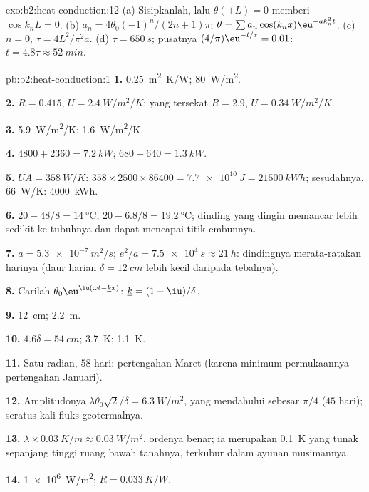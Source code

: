 \begin{solution}{exo:b2:heat-conduction:12}
(a) Sisipkanlah, lalu $\theta(\pm L) = 0$ memberi $\cos k_nL = 0$. (b) $a_n =
4\theta_0(-1)^n/(2n+1)\pi$; $\theta = \sum a_n\cos(k_nx)\eu^{-ak_n^2t}$. (c) $n = 0$,
$\tau = 4L^2/\pi^2a$. (d) $\tau = \qty{650}{s}$; pusatnya $(4/\pi)\eu^{-t/\tau} = 0.01$:
$t = 4.8\tau \approx \qty{52}{min}$.
\end{solution}

\begin{solution}{pb:b2:heat-conduction:1}
\textbf{1.} \qty{0.25}{m^2.K/W}; \qty{80}{W/m^2}.

\textbf{2.} $R = 0.415$, $U = \qty{2.4}{W/m^2/K}$; yang tersekat $R = 2.9$, $U =
\qty{0.34}{W/m^2/K}$.

\textbf{3.} \qty{5.9}{W/m^2/K}; \qty{1.6}{W/m^2/K}.

\textbf{4.} $4800 + 2360 = \qty{7.2}{kW}$; $680 + 640 = \qty{1.3}{kW}$.

\textbf{5.} $UA = \qty{358}{W/K}$: $358 \times 2500 \times 86400 = \qty{7.7e10}{J} =
\qty{21500}{kWh}$; sesudahnya, \qty{66}{W/K}: \qty{4000}{kWh}.

\textbf{6.} $20 - 48/8 = \qty{14}{\celsius}$; $20 - 6.8/8 = \qty{19.2}{\celsius}$;
dinding yang dingin memancar lebih sedikit ke tubuhnya dan dapat mencapai titik embunnya.

\textbf{7.} $a = \qty{5.3e-7}{m^2/s}$; $e^2/a = \qty{7.5e4}{s} \approx \qty{21}{h}$:
dindingnya merata-ratakan harinya (daur harian $\delta = \qty{12}{cm}$ lebih kecil daripada
tebalnya).

\textbf{8.} Carilah $\theta_0\eu^{\iu(\omega t - \underline kx)}$: $\underline k = (1 - \iu)/\delta$.

\textbf{9.} \qty{12}{cm}; \qty{2.2}{m}.

\textbf{10.} $4.6\delta = \qty{54}{cm}$; \qty{3.7}{K}; \qty{1.1}{K}.

\textbf{11.} Satu radian, $58$ hari: pertengahan Maret (karena minimum
permukaannya pertengahan Januari).

\textbf{12.} Amplitudonya $\lambda\theta_0\sqrt2/\delta = \qty{6.3}{W/m^2}$, yang mendahului sebesar
$\pi/4$ ($45$ hari); seratus kali fluks geotermalnya.

\textbf{13.} $\lambda \times \qty{0.03}{K/m} \approx \qty{0.03}{W/m^2}$, ordenya benar; ia
merupakan \qty{0.1}{K} yang tunak sepanjang tinggi ruang bawah tanahnya, terkubur dalam
ayunan musimannya.

\textbf{14.} \qty{1e6}{W/m^2}; $R = \qty{0.033}{K/W}$.


\end{solution}
